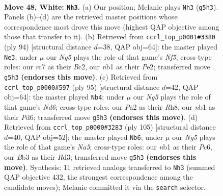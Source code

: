 \documentclass[11pt]{article}
\begin{document}
\clearpage

\begin{figure}[p]\centering
\begin{subfigure}{0.46\textwidth}\centering
\resizebox{\linewidth}{!}{%
\newchessgame
\chessboard[
  setfen={6k1/2r2p1p/b5p1/4PpN1/5P2/1B6/P4KPP/1n6 w - - 4 48},
  showmover=false,
  pgfstyle=straightmove, color=movearrow, markmove={g5-h3}
]}
\caption{}
\end{subfigure}\hfill
\begin{subfigure}{0.46\textwidth}\centering
\resizebox{\linewidth}{!}{%
\newchessgame
\chessboard[
  setfen={5k2/5pp1/7p/1r2bN1P/6P1/1P6/2B1PPK1/8 w - - 1 48},
  showmover=false,
  pgfstyle=straightmove, color=movearrow, markmove={f5-e3}
]}
\caption{}
\end{subfigure}
\\[4pt]
\begin{subfigure}{0.46\textwidth}\centering
\resizebox{\linewidth}{!}{%
\newchessgame
\chessboard[
  setfen={7r/1p3p2/2kppb2/8/3P1PK1/2NnP1B1/1PR5/8 b - - 13 48},
  showmover=false,
  pgfstyle=straightmove, color=movearrow, markmove={d3-b4}
]}
\caption{}
\end{subfigure}\hfill
\begin{subfigure}{0.46\textwidth}\centering
\resizebox{\linewidth}{!}{%
\newchessgame
\chessboard[
  setfen={7B/1p3k2/2p3p1/1p6/nP4P1/3r1PK1/1P2R3/8 b - - 7 53},
  showmover=false,
  pgfstyle=straightmove, color=movearrow, markmove={a4-b6}
]}
\caption{}
\end{subfigure}
\caption{\textbf{Move 48, White: \texttt{Nh3}.} (a) Our position; Melanie plays \texttt{Nh3} (\texttt{g5h3}). Panels (b)--(d) are the retrieved master positions whose correspondence most drove this move (highest QAP objective among those that transfer to it). (b) Retrieved from \texttt{ccrl\_top\_p0001\#3380} (ply 94) [structural distance $d$=38, QAP obj=64]: the master played \texttt{Ne3}; under $\mu$ our \emph{Ng5} plays the role of that game's \emph{Nf5}; cross-type roles: our \emph{r}c7 as their \emph{B}c2, our \emph{n}b1 as their \emph{P}e2; transferred move \texttt{g5h3} \textbf{(endorses this move)}. (c) Retrieved from \texttt{ccrl\_top\_p0000\#597} (ply 95) [structural distance $d$=42, QAP obj=64]: the master played \texttt{Nb4}; under $\mu$ our \emph{Ng5} plays the role of that game's \emph{Nd6}; cross-type roles: our \emph{P}a2 as their \emph{R}h8, our \emph{n}b1 as their \emph{P}d6; transferred move \texttt{g5h3} \textbf{(endorses this move)}. (d) Retrieved from \texttt{ccrl\_top\_p0000\#3283} (ply 105) [structural distance $d$=40, QAP obj=52]: the master played \texttt{Nb6}; under $\mu$ our \emph{Ng5} plays the role of that game's \emph{Na5}; cross-type roles: our \emph{n}b1 as their \emph{P}c6, our \emph{B}b3 as their \emph{R}d3; transferred move \texttt{g5h3} \textbf{(endorses this move)}. Synthesis: 11 retrieved analogs transferred to \texttt{Nh3} (summed QAP objective 432, the strongest correspondence among the candidate moves); Melanie committed it via the \texttt{search} selector.}
\label{fig:thought-m94}
\end{figure}
\end{document}
